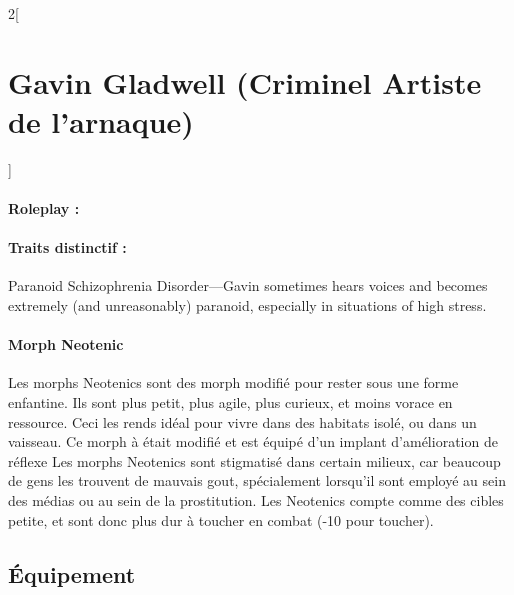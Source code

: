 \documentclass[a4paper,9pt]{article}
\begin{document}
\begin{multicols}{2}[\section*{Gavin Gladwell (Criminel Artiste de l'arnaque)}]
   \paragraph{Roleplay :}

   \paragraph{Traits distinctif :} Paranoid Schizophrenia Disorder—Gavin sometimes hears voices and
becomes extremely (and unreasonably) paranoid, especially in situations of high
stress.


   \paragraph{Morph Neotenic}
   Les morphs Neotenics sont des morph modifié pour rester sous une forme
   enfantine.
   Ils sont plus petit, plus agile, plus curieux, et moins vorace en ressource.
   Ceci les rends idéal pour vivre dans des habitats isolé, ou dans un vaisseau.
   Ce morph à était modifié et est équipé d'un implant d'amélioration de réflexe
   Les morphs Neotenics sont stigmatisé dans certain milieux, car beaucoup de gens
   les trouvent de mauvais gout, spécialement lorsqu'il sont employé au sein
   des médias ou au sein de la prostitution.
   Les Neotenics compte comme des cibles petite, et sont donc plus dur
   à toucher en combat (-10 pour toucher).

   \subsection*{Équipement}


\end{multicols}
\end{document}
